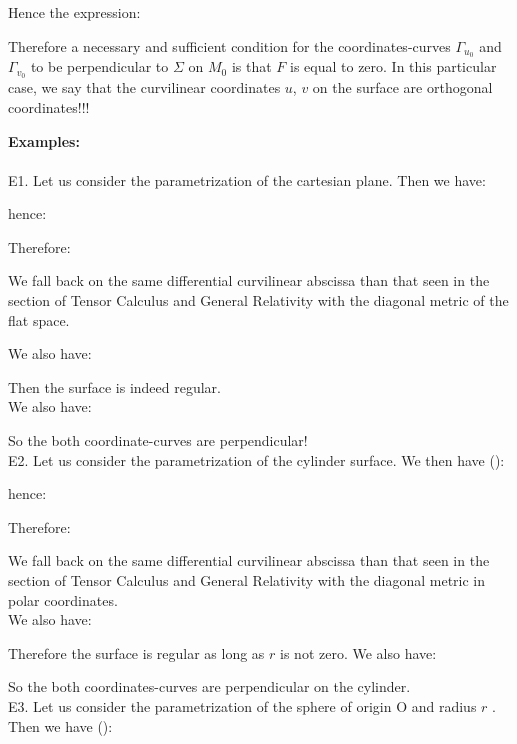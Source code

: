 {		Hence the expression:
	
	Therefore a necessary and sufficient condition for the coordinates-curves $\Gamma_{u_0}$ and $\Gamma_{v_0}$ to be perpendicular to $\Sigma$ on $M_0$ is that $F$ is equal to zero. In this particular case, we say that the curvilinear coordinates $u$, $v$ on the surface are orthogonal coordinates!!!
	\begin{tcolorbox}[colframe=black,colback=white,sharp corners]
	\textbf{{\Large {}}Examples:}\\\\
	E1. Let us consider the parametrization of the cartesian plane. Then we have:
	
	hence:
	
	Therefore:
	
	We fall back on the same differential curvilinear abscissa than that seen in the section of Tensor Calculus and General Relativity with the diagonal metric of the flat space.
	
	We also have:
	
	Then the surface is indeed regular. \\

	We also have:
	
	So the both coordinate-curves are perpendicular!\\
	
	E2. Let us consider the parametrization of the cylinder surface. We then have ():
	
	hence:
	
	\end{tcolorbox}
	
	\begin{tcolorbox}[colframe=black,colback=white,sharp corners]
	Therefore:
	
	We fall back on the same differential curvilinear abscissa than that seen in the section of Tensor Calculus and General Relativity with the diagonal metric in polar coordinates.\\
	
	We also have:
	
	Therefore the surface is regular as long as $r$ is not zero. We also have:
	
	So the both coordinates-curves are perpendicular on the cylinder.\\
	
	E3. Let us consider the parametrization of the sphere of origin O and radius $r$ \label{metric two sphere}. Then we have ():
	

\end{tcolorbox}}
